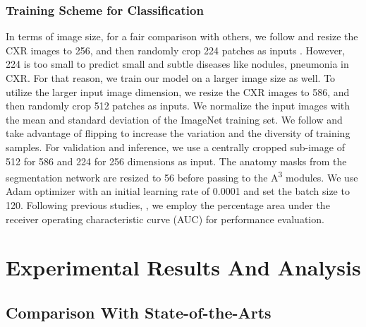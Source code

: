 \documentclass[journal]{IEEEtran}
\begin{document}
\subsubsection{Training Scheme for Classification}
In terms of image size, for a fair comparison with others, we follow \cite{wang2020triple, Rajpurkar2017CheXNetRP, XU202196, PHAM2021186} and resize the CXR images to 256, and then randomly crop 224 patches as inputs \cite{Yan2018WeaklySD}. However, 224 is too small to predict small and subtle diseases like nodules, pneumonia in CXR. For that reason, we train our model on a larger image size as well. To utilize the larger input image dimension, we resize the CXR images to 586, and then randomly crop 512 patches as inputs. We normalize the input images with the mean and standard deviation of the ImageNet training set. We follow \cite{Yan2018WeaklySD} and take advantage of flipping to increase the variation and the diversity of training samples. For validation and inference, we use a centrally cropped sub-image of 512 for 586 and 224 for 256 dimensions as input. The anatomy masks from the segmentation network are resized to 56 before passing to the A\textsuperscript{3} modules. We use Adam optimizer with an initial learning rate of 0.0001 and set the batch size to 120. Following previous studies, \cite{8099852, Luo2020DeepME}, we employ the percentage area under the receiver operating characteristic curve (AUC) for performance evaluation.

\section{Experimental Results And Analysis}
\subsection{Comparison With State-of-the-Arts}
\end{document}
